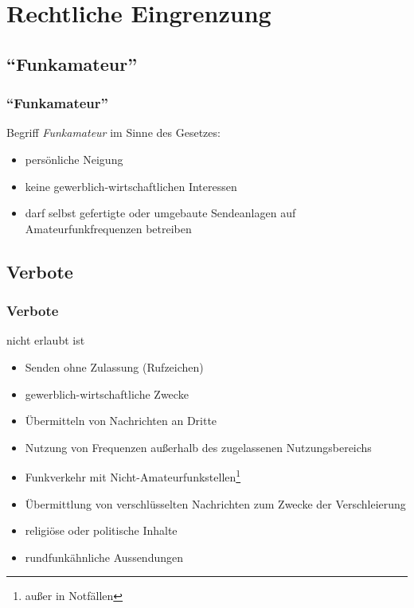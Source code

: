 \section{Rechtliche Eingrenzung}

\subsection{``Funkamateur''}

\begin{frame}
  \frametitle{``Funkamateur''}

  Begriff \emph{Funkamateur} im Sinne des Gesetzes:

  \begin{itemize}
    \item persönliche Neigung
    \item keine gewerblich-wirtschaftlichen Interessen
    \item darf selbst gefertigte oder umgebaute Sendeanlagen auf Amateurfunkfrequenzen betreiben
  \end{itemize}

\end{frame}

\subsection{Verbote}

\begin{frame}
  \frametitle{Verbote}

  nicht erlaubt ist

  \begin{itemize}
    \item Senden ohne Zulassung (Rufzeichen)
    \item gewerblich-wirtschaftliche Zwecke
    \item Übermitteln von Nachrichten an Dritte
    \item Nutzung von Frequenzen außerhalb des zugelassenen Nutzungsbereichs
    \item Funkverkehr mit Nicht-Amateurfunkstellen\footnote{außer in Notfällen}
    \item Übermittlung von verschlüsselten Nachrichten zum Zwecke der Verschleierung
    \item religiöse oder politische Inhalte
    \item rundfunkähnliche Aussendungen
  \end{itemize}

\end{frame}

